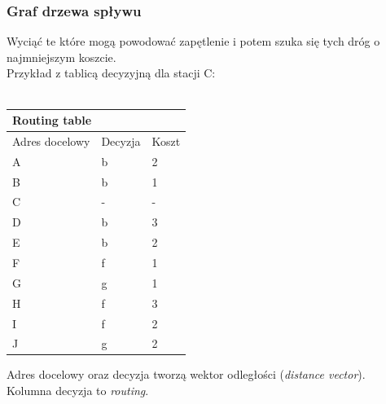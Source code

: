 			\subsubsection{Graf drzewa spływu}
				Wyciąć te które mogą powodować zapętlenie i potem szuka się tych dróg o najmniejszym koszcie.\\
				Przykład z tablicą decyzyjną dla stacji C:\\\\
				\begin{tabular}{ccc}
					\multicolumn{3}{l}{Routing table}                                                                                                  \\ \hline
					\multicolumn{1}{l|}{Adres docelowy}  & \multicolumn{1}{l|}{Decyzja}         & \multicolumn{1}{l}{Koszt}                            \\ \hline
					\multicolumn{1}{l|}{A} & \multicolumn{1}{l|}{b}                & \multicolumn{1}{l}{2}                           \\
					\multicolumn{1}{l|}{B} & \multicolumn{1}{l|}{b}                & \multicolumn{1}{l}{1}                           \\
					\multicolumn{1}{l|}{C} & \multicolumn{1}{l|}{-}                & \multicolumn{1}{l}{-}                           \\
					\multicolumn{1}{l|}{D} & \multicolumn{1}{l|}{b}                & \multicolumn{1}{l}{3}                           \\
					\multicolumn{1}{l|}{E} & \multicolumn{1}{l|}{b}                & \multicolumn{1}{l}{2}                           \\
					\multicolumn{1}{l|}{F} & \multicolumn{1}{l|}{f}                & \multicolumn{1}{l}{1}                           \\
					\multicolumn{1}{l|}{G} & \multicolumn{1}{l|}{g}                & \multicolumn{1}{l}{1}                           \\
					\multicolumn{1}{l|}{H} & \multicolumn{1}{l|}{f}                & \multicolumn{1}{l}{3}                           \\
					\multicolumn{1}{l|}{I} & \multicolumn{1}{l|}{f}                & \multicolumn{1}{l}{2}                           \\
					\multicolumn{1}{l|}{J} & \multicolumn{1}{l|}{g}                & \multicolumn{1}{l}{2}                            
				\end{tabular}
				Adres docelowy oraz decyzja tworzą wektor odległości (\emph{distance vector}).\\
				Kolumna decyzja to \emph{routing}.\\
